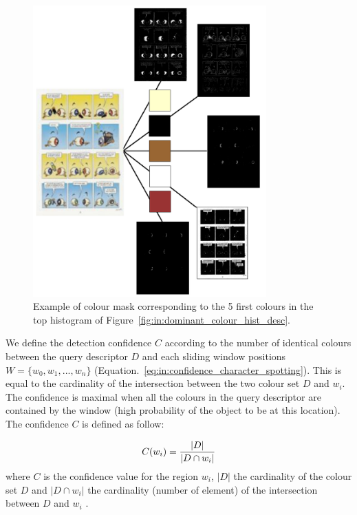  \begin{figure}[!ht]  %
   \centering
  \includegraphics[width=0.8\textwidth]{masks.png}
  \caption[Colour mask corresponding to five colour of the query descriptor]{Example of colour mask corresponding to the 5 first colours in the top histogram of Figure~\ref{fig:in:dominant_colour_hist_desc}.}
  \label{fig:in:masks}
 \end{figure}


We define the detection confidence $C$ according to the number of identical colours between the query descriptor $D$ and each sliding window positions $W=\{w_0,w_1,...,w_n\}$ (Equation.~\ref{eq:in:confidence_character_spotting}).
This is equal to the cardinality of the intersection between the two colour set $D$ and $w_i$. The confidence is maximal when all the colours in the query descriptor are contained by the window (high probability of the object to be at this location).
The confidence $C$ is defined as follow:

\begin{equation}\label{eq:in:confidence_character_spotting}
   C(w_i) = \frac{|D|}{|D \cap w_i|}\\
 \end{equation}
where $C$ is the confidence value for the region $w_i$, $|D|$ the cardinality of the colour set $D$ and $|D \cap w_i|$ the cardinality (number of element) of the intersection between $D$ and $w_i$ .

